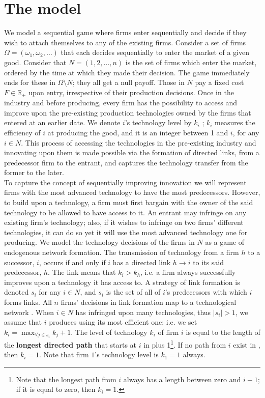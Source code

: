 \documentclass{article}
\begin{document}
\section{The model}
\indent We model a sequential game where firms enter sequentially and decide if they wish to attach themselves to any of the existing firms. Consider a set of firms $\Omega=(\omega_1,\omega_2,\ldots)$ that each decides sequentially to enter the market of a given good. Consider that $N=(1,2,\ldots,n)$ is the set of firms which enter the market, ordered by the time at which they made their decision. The game immediately ends for these in $\Omega\setminus N$; they all get a null payoff. Those in $N$ pay a fixed cost $F\in \mathbb{R}_+$ upon entry, irrespective of their production decisions. Once in the industry and before producing, every firm has the possibility to access and improve upon the pre-existing production technologies owned by the firms that entered at an earlier date. We denote $i$'s technology level by $k_i$ ; $k_i$ measures the efficiency of $i$ at producing the good, and it is an integer between 1 and $i$, for any $i\in N$. This process of accessing the technologies in the pre-existing industry and innovating upon them is made possible via the formation of directed links, from a predecessor firm to the entrant, and captures the technology transfer from the former to the later. \\
\indent To capture the concept of sequentially improving innovation we will represent firms with the most advanced technology to have the most predecessors. However, to build upon a technology, a firm must first bargain with the owner of the said technology to be allowed to have access to it. An entrant may infringe on any existing firm's technology; also, if it wishes to infringe on two firms' different technologies, it can do so yet it will use the most advanced technology one for producing. We model the technology decisions of the firms in $N$ as a game of endogenous network formation. The transmission of technology from a firm $h$ to a successor, $i$, occurs if and only if $i$ has a directed link $h\rightarrow i$ to its said predecessor, $h$. The link means that $k_i>k_h$, i.e. a firm always successfully improves upon a technology it has access to. A strategy of link formation is denoted $s_i$ for any $i\in N$, and $s_i$ is the set of all of $i$'s predecessors with which $i$ forms links. All $n$ firms' decisions in link formation map to a technological network . When $i\in N$ has infringed upon many technologies, thus $|s_i|>1$, we assume that $i$ produces using its most efficient one: i.e. we set $k_i=\max_{\forall j\in s_i} k_j+1$. The level of technology $k_i$ of firm $i$ is equal to the length of the \textbf{longest directed path} that starts at $i$ in  plus 1\footnote{Note that the longest path from $i$ always has a length between zero and $i-1$; if it is equal to zero, then $k_i=1$.}. If no path from $i$ exist in , then $k_i=1$. Note that firm $1$'s technology level is $k_1=1$ always. \\
\end{document}
